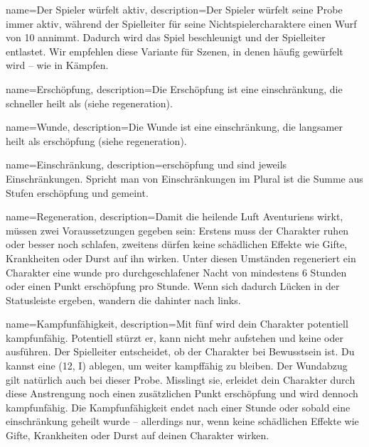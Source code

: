 {
    name={Der Spieler würfelt aktiv},
    description={Der Spieler würfelt seine Probe immer aktiv, während der Spielleiter für seine Nicht­s­­pieler­charaktere einen Wurf von 10 annimmt. Dadurch wird das Spiel beschleunigt und der Spiel­leiter entlastet. Wir empfehlen diese Variante für Szenen, in denen häufig gewürfelt wird – wie in Kämpfen.}}

{
    name={Erschöpfung},
    description={Die Erschöpfung ist eine \gls{einschränkung}, die schneller heilt als  (siehe \gls{regeneration}).}}

{
    name={Wunde},
    description={Die Wunde ist eine \gls{einschränkung}, die langsamer heilt als \gls{erschöpfung} (siehe \gls{regeneration}).}}

{
    name={Einschränkung},
    description={\gls{erschöpfung} und  sind jeweils Einschränkungen. Spricht man von Einschränkungen im Plural ist die Summe aus Stufen \gls{erschöpfung} und  gemeint.}}

{
    name={Regeneration},
    description={Damit die heilende Luft Aventuriens wirkt, müssen zwei Vorauss­etzungen gegeben sein: Erstens muss der Charakter ruhen oder besser noch schlafen, zweitens dürfen keine schädlichen Effekte wie Gifte, Krankheiten oder Durst auf ihn wirken. Unter diesen Umständen regeneriert ein Charakter eine \gls{wunde} pro durchgeschlafener Nacht von mindestens 6 Stunden oder einen Punkt \gls{erschöpfung} pro Stunde. Wenn sich dadurch Lücken in der Statusleiste ergeben, wandern die  dahinter nach links.}}

{
    name={Kampfunfähigkeit},
    description={Mit fünf  wird dein Charakter potentiell kampfunfähig. Potentiell stürzt er, kann nicht mehr aufstehen und keine  oder  ausführen. Der Spielleiter entscheidet, ob der Charakter bei Bewusstsein ist. Du kannst eine  (12, \gls{I}) ablegen, um weiter kampffähig zu bleiben. Der Wundabzug gilt natürlich auch bei dieser Probe. Misslingt sie, erleidet dein Charakter durch diese Anstrengung noch einen zusätzlichen Punkt \gls{erschöpfung} und wird dennoch kampfunfähig. Die Kampfunfähigkeit endet nach einer Stunde oder sobald eine \gls{einschränkung} geheilt wurde – allerdings nur, wenn keine schädlichen Effekte wie Gifte, Krankheiten oder Durst auf deinen Charakter wirken.}}


